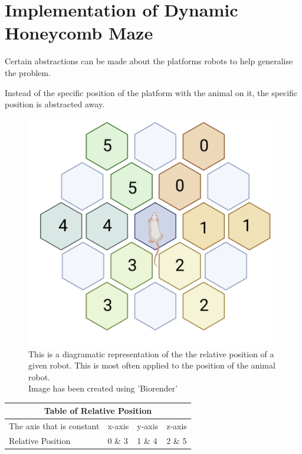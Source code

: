 \section{Implementation of Dynamic Honeycomb Maze}

Certain abstractions can be made about the platforms robots to help generalise the problem.


Instead of the specific position of the platform with the animal on it, the specific position is abstracted away. 

\begin{figure}
    \centering
    \includegraphics[scale = 0.5 ]{images/relative_position.png}
    \caption{This is a diagramatic representation of the the relative position of a given robot. This is most often applied to the position of the animal robot. 
    \\ Image has been created using 'Biorender' \cite{biorender}}
    \label{fig:relative_position}
\end{figure}

\begin{tabular}{|p{3cm}||p{3cm}|p{3cm}|p{3cm}|}
 \hline
 \multicolumn{4}{|c|}{Table of Relative Position} \\
 \hline
 The axis that is constant & x-axis & y-axis & z-axis \\
 \hline
Relative Position    & 0 \&  3 & 1 \& 4 & 2 \& 5 \\

 \hline
\end{tabular}


